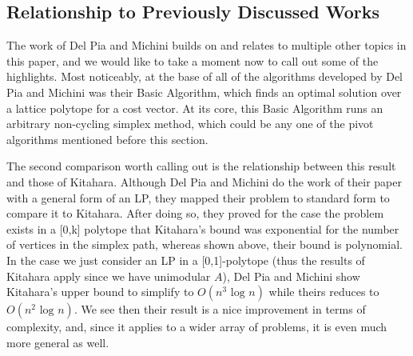 \documentclass[11pt]{article}
\begin{document}
\subsection{Relationship to Previously Discussed Works}
The work of Del Pia and Michini builds on and relates to multiple other topics in this paper, and we would like to take a moment now to call out some of the highlights. Most noticeably, at the base of all of the algorithms developed by Del Pia and Michini was their Basic Algorithm, which finds an optimal solution over a lattice polytope for a cost vector. At its core, this Basic Algorithm runs an arbitrary non-cycling simplex method, which could be any one of the pivot algorithms mentioned before this section.

The second comparison worth calling out is the relationship between this result and those of Kitahara. Although Del Pia and Michini do the work of their paper with a general form of an LP, they mapped their problem to standard form to compare it to Kitahara. After doing so, they proved for the case the problem exists in a [0,k] polytope that Kitahara's bound was exponential for the number of vertices in the simplex path, whereas shown above, their bound is polynomial. In the case we just consider an LP in a [0,1]-polytope (thus the results of Kitahara apply since we have unimodular $A$), Del Pia and Michini show Kitahara's upper bound to simplify to  $O(n^3 \text{ log } n)$ while theirs reduces to $O(n^2 \text{ log } n)$. We see then their result is a nice improvement in terms of complexity, and, since it applies to a wider array of problems, it is even much more general as well.
\end{document}
